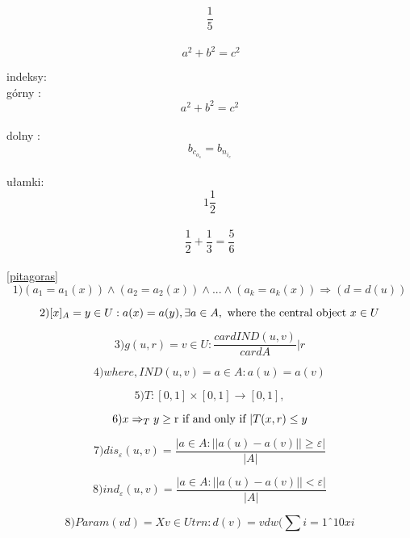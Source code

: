 \documentclass[a4paper,12pt]{article}
\title{}
\author{Daniel Maćkiewicz}
\date{2017.11.15}
\begin{document}
\maketitle
\begin{equation}
\frac{1}{5}
\label{eq:rownanie1}
\end{equation}\\

\begin{equation}
\ a^2+b^2=c^2
\label{pitagoras}
\end{equation}


indeksy:\\

górny : $$a^2+b^2=c^2$$\\
dolny : $$b_c_o_s=b_n_i_c$$\\

ułamki:\\

$$1\frac{1}{2}$$\\
$$\frac{1}{2}+\frac{1}{3}=\frac{5}{6}$$\\


\eqref{pitagoras}\\


 $$1) (a_1 = a_1(x))  \wedge (a_2 = a_2(x))  \wedge . . .  \wedge (a_k = a_k(x)) \Longrightarrow(d = d(u))$$
 
 $$2) [x]_A = {y \in U : a(x) = a(y), \exists a \in A},\textnormal{ where the central object }x \in U $$

 $$3) g(u, r) = {v \in U :
 \frac {card{IND(u, v)}}
 {card{A}}| ­ r} $$

 $$4)where, IND(u, v) = {a \in A : a(u) = a(v)}$$

 $$5) T : [0, 1] \times [0, 1] \rightarrow [0, 1],$$

 $$6) x \Rightarrow _T y \geq \textnormal{r if and only if }| T(x, r)  \leq y $$

 $$7)dis_\varepsilon (u, v) = \frac{ |{a \in A : ||a(u) - a(v)|| \geq  \varepsilon}| 
 }{|A|} $$

 $$ 8)ind_\varepsilon (u, v) =\frac{ |{a \in A : ||a(u) - a(v)||} < \varepsilon|}
 {|A|}$$

 $$8) Param(vd) = X
 {v∈Utrn:d(v)=vd}
 w(
 \sum{i=1}ˆ{10}x{i}$$
 
\section{}
\end{document}
